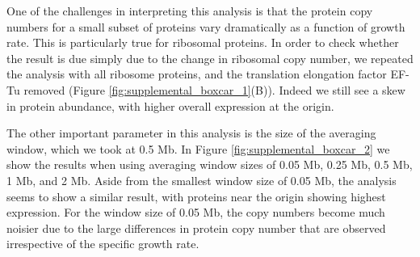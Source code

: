 \begin{figure}
    \begin{fullwidth}
\end{fullwidth}
\end{figure}

One of the challenges in interpreting this analysis is that the protein copy
numbers for a small subset of proteins vary dramatically as a function of growth
rate. This is particularly true for ribosomal proteins. In order to check
whether the result is due simply due to the change in ribosomal copy number, we
repeated the analysis with all ribosome proteins, and the translation elongation
factor EF-Tu removed (Figure \ref{fig:supplemental_boxcar_1}(B)). Indeed we still
see a skew in  protein abundance, with higher overall expression at the origin.

The other important parameter in this analysis is the size of the averaging
window, which we took at 0.5 Mb. In Figure \ref{fig:supplemental_boxcar_2} we show
the  results when using averaging window sizes of 0.05 Mb, 0.25 Mb, 0.5 Mb, 1
Mb, and 2 Mb. Aside from the smallest window size of 0.05 Mb, the analysis seems
to show a similar result, with proteins near the origin showing highest
expression. For the window size of  0.05 Mb, the copy numbers become much
noisier due to the large differences in protein copy number  that are observed
irrespective of the specific growth rate.

